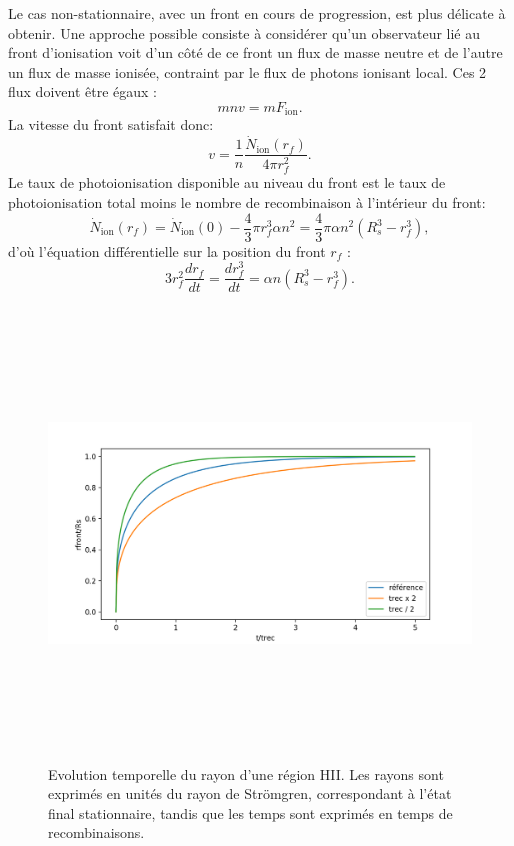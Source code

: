 Le cas non-stationnaire, avec un front en cours de progression, est plus délicate à obtenir. Une approche possible consiste à considérer qu'un observateur lié au front d'ionisation voit d'un côté de ce front un flux de masse neutre et de l'autre un flux de masse ionisée, contraint par le flux de photons ionisant local. Ces 2 flux doivent être égaux :
\begin{equation}
m n v = m F_\mathrm{ion}.
\end{equation}
La vitesse du front satisfait donc:
\begin{equation}
v=\frac{1}{n}\frac{\dot N_\mathrm{ion}(r_f)}{4\pi r_f^2}.
\end{equation}
Le taux de photoionisation disponible au niveau du front est le taux de photoionisation total moins le nombre de recombinaison à l'intérieur du front:
\begin{equation}
\dot N_\mathrm{ion}(r_f)=\dot N_\mathrm{ion}(0)-\frac{4}{3}\pi r_f^3\alpha n^2=\frac{4}{3}\pi \alpha n^2 (R_s^3-r_f^3),
\end{equation}
d'où l'équation différentielle sur la position du front $r_f$ :
\begin{equation}
3r_f^2\frac{d r_f}{dt}=\frac{dr_f^3}{dt}=\alpha n  (R_s^3-r_f^3).
\end{equation}

\begin{figure}[htbp]
	\centering
		\includegraphics[height=12cm]{figs/strom.png}
		\caption[Evolution temporelle de la position d'un front ionisant]{Evolution temporelle du rayon d'une région HII. Les rayons sont exprimés en unités du rayon de Strömgren, correspondant à l'état final stationnaire, tandis que les temps sont exprimés en temps de recombinaisons.}
	\label{f:strom}
\end{figure}

